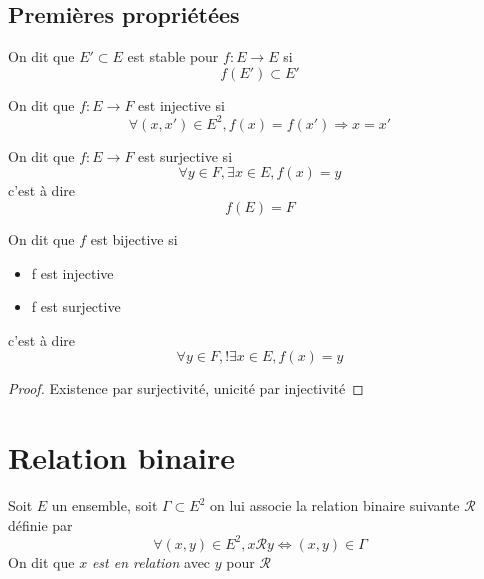 \documentclass[11pt,colorlinks]{book}
\theoremstyle{mytheoremstyle}
\theoremstyle{mytheoremstyle}
\theoremstyle{mytheoremstyle}
\theoremstyle{mytheoremstyle}
\theoremstyle{mytheoremstyle}
\theoremstyle{mytheoremstyle}
\theoremstyle{mytheoremstyle}
\theoremstyle{mytheoremstyle}
\theoremstyle{myproblemstyle}
\begin{document}
\subsection{Premières propriétées}
\begin{definition}
  On dit que $E' \subset E$ est stable pour $f : E \to E$ si 
  \begin{equation*}
    f(E') \subset E'
  \end{equation*}
\end{definition}
\begin{definition}
  On dit que $f : E \to F$ est injective si
  \begin{equation*}
    \forall (x,x') \in E^2, f(x) = f(x') \Rightarrow x=x'
  \end{equation*}
\end{definition}
\begin{definition}
  On dit que $f : E \to F$ est surjective si 
  \begin{equation*}
    \forall y \in F, \exists x \in E, f(x)=y
  \end{equation*}
  c'est à dire 
  \begin{equation*}
    f(E) = F
  \end{equation*}
\end{definition}
\begin{definition}
  On dit que $f$ est bijective si 
  \begin{itemize}
    \item f est injective 
    \item f est surjective
  \end{itemize}
  c'est à dire 
  \begin{equation*}
    \forall y \in F, !\exists x \in E, f(x)=y
  \end{equation*}
  \begin{proof}
    Existence par surjectivité, unicité par injectivité
  \end{proof}
\end{definition}

\section{Relation binaire}
\begin{definition}
  Soit $E$ un ensemble, soit $\Gamma \subset E^2$ on lui associe la relation binaire suivante $\mathcal{R}$ définie par 
  \begin{equation*}
    \forall (x,y) \in E^2, x\mathcal{R}y \Leftrightarrow (x,y) \in \Gamma
  \end{equation*}
  On dit que $x$ \textit{est en relation} avec $y$ pour $\mathcal{R}$
\end{definition}
\end{document}
